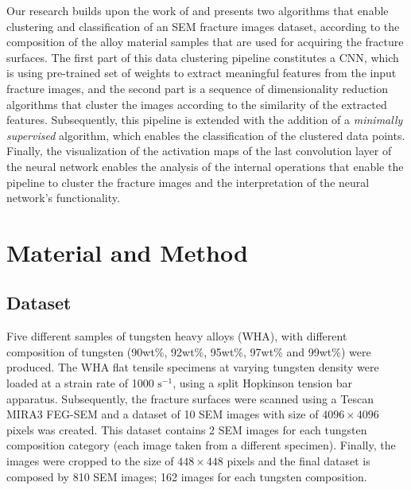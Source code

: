 \documentclass[authoryear,preprint,review,12pt, singleside]{elsarticle}
\begin{document}
Our research builds upon the work of \citet{holm1} and presents two algorithms that enable clustering and classification of an SEM fracture images dataset, according to the composition of the alloy material samples that are used for acquiring the fracture surfaces. The first part of this data clustering pipeline constitutes a CNN, which is using pre-trained set of weights to extract meaningful features from the input fracture images, and the second part is a sequence of dimensionality reduction algorithms that cluster the images according to the similarity of the extracted features. Subsequently, this pipeline is extended with the addition of a \textit{minimally supervised} algorithm, which enables the classification of the clustered data points. Finally, the visualization of the activation maps of the last convolution layer of the neural network enables the analysis of the internal operations that enable the pipeline to cluster the fracture images and the interpretation of the neural network's functionality.



\section{Material and Method}

\subsection{Dataset}

Five different samples of  tungsten  heavy  alloys  (WHA), with different composition of tungsten (90wt\%, 92wt\%, 95wt\%, 97wt\% and 99wt\%) were produced. The WHA flat tensile specimens at varying tungsten density were loaded at a strain rate of 1000 $\text{s}^{-1}$, using a split Hopkinson tension bar apparatus. Subsequently, the fracture surfaces were scanned using a Tescan MIRA3 FEG-SEM and a dataset of 10 SEM images with size of $4096 \times 4096$ pixels was created. This dataset contains 2 SEM images for each tungsten composition category (each image taken from a different specimen).  Finally, the images were cropped to the size of $448 \times 448$ pixels and the final dataset is composed by 810 SEM images; 162 images for each tungsten composition. 
\end{document}
